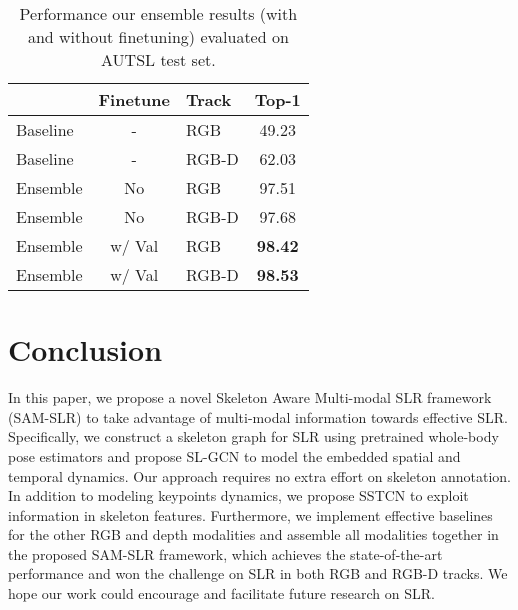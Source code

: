\documentclass[final]{cvpr}
\begin{document}
\begin{table}[t]
\begin{center}
\begin{tabular}{l | c | l | c }
\hline
  & Finetune & Track & Top-1 \\
\hline
\hline
Baseline & - & RGB  & 49.23\\
Baseline & - & RGB-D & 62.03\\
\hline
Ensemble & No & RGB & 97.51\\
Ensemble & No & RGB-D & 97.68\\
\hline
Ensemble & w/ Val & RGB     & \textbf{98.42}\\
Ensemble & w/ Val & RGB-D   & \textbf{98.53}\\
\hline
\end{tabular}
\end{center}\caption{Performance our ensemble results (with and without finetuning) evaluated on AUTSL test set.}
\label{tab:test_results}
\end{table}

\section{Conclusion}




In this paper, we propose a novel Skeleton Aware Multi-modal SLR framework (SAM-SLR) to take advantage of multi-modal information towards effective SLR. Specifically, we construct a skeleton graph for SLR using pretrained whole-body pose estimators and propose SL-GCN to model the embedded spatial and temporal dynamics. Our approach requires no extra effort on skeleton annotation. In addition to modeling keypoints dynamics, we propose SSTCN to exploit information in skeleton features. Furthermore, we implement effective baselines for the other RGB and depth modalities and assemble all modalities together in the proposed SAM-SLR framework, which achieves the state-of-the-art performance and won the challenge on SLR in both RGB and RGB-D tracks. We hope our work could encourage and facilitate future research on SLR.






{\small
\balance


}
\end{document}
